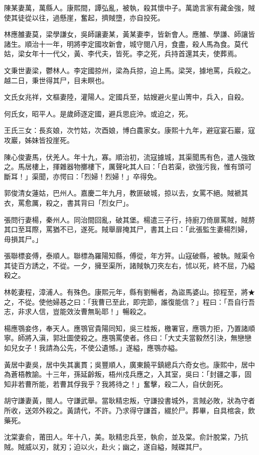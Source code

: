 \begin{pinyinscope}
陳某妻萬，萬縣人。康熙間，譚弘亂，被執，殺其懷中子。萬詭言家有藏金強，賊使其徒從以往，過懸崖，奮起，擠賊墮，亦自投死。

林應雒妻莫，梁學謙女，吳師讓妻某，黃某妻李，皆新會人。應雒、學謙、師讓皆諸生。順治十一年，明將李定國攻新會，城守閱八月，食盡，殺人馬為食。莫代姑，梁女年十一代父，黃、李代夫，皆死。李之死，兵持首還其夫，使葬焉。

文秉世妻梁，鬱林人。李定國掠州，梁為兵掠，迫上馬。梁哭，據地罵，兵殺之。越二日，秉世得其尸，目未瞑也。

文氏女兆祥，文樞妻陸，灌陽人。定國兵至，姑嫂避火星山箐中，兵入，自殺。

何氏女，昭平人。是歲師逐定國，避兵思庇沖。或迫之，死。

王氏三女：長亥娘，次竹姑，次酉娘，博白農家女。康熙十九年，避寇宴石巖，寇攻巖，姊妹皆投崖死。

陳心俊妻馬，伏羌人。年十九，寡。順治初，流寇據城，其渠聞馬有色，遣人強致之。馬居樓上，揮雜器物擲樓下，厲聲叱其人曰：「白若渠，欲強污我，惟有頭可斷耳！」渠聞，亦愕曰：「烈婦！烈婦！」卒得免。

郭俊清女蓮姑，巴州人。嘉慶二年九月，教匪破城，掠以去，女罵不絕。賊褫其衣，罵愈厲，殺之，書其背曰「烈女尸」。

張問行妻楊，秦州人。同治間回亂，破其堡。楊遣三子行，持廚刀倚扉罵賊，賊剺其口至耳際，罵猶不已，遂死。賊舉扉掩其尸，書其上曰：「此張監生妻楊烈婦，毋損其尸。」

張聯標妾傅，泰順人。聯標為羅陽知縣，傅從，年方笄。山寇破縣，被執。賊渠令其徒百方誘之，不從。一夕，擁至渠所，諸賊執刀夾左右，怵以死，終不屈，乃縊殺之。

林乾妻程，漳浦人。有殊色。康熙元年，縣有劉暢者，為盜馬婆山。掠程至，將★之，不從。使他婦惎之曰：「我曹已至此，即完節，誰復能信？」程曰：「吾自行吾志，非求人信，豈能效汝曹無恥耶！」暢殺之。

楊應鶚妾佟，奉天人。應鶚官貴陽同知，吳三桂叛，檄署官，應鶚力拒，乃置諸順寧。師將入滇，郭壯圖使殺之。應鶚罵使者。佟曰：「大丈夫當毅然引決，無戀戀如兒女子！我請為公先，不使公遺憾。」遂縊，應鶚亦縊。

黃居中妻吳，居中失其裏貫；吳豐順人，廣東饒平鎮總兵六奇女也。康熙中，居中為蒼梧教諭。十三年，孫延齡叛，梧州戍兵應之，入其室，吳曰：「封疆之事，固知非若曹所能，若曹其俘我乎？我將待之！」奮擊，殺二人，自伏劍死。

胡守謙妻黃，閩人。守謙武舉。當耿精忠叛，守謙投書城外，言賊必敗，狀為守者所收，送郊外殺之。黃請代，不許。乃求得守謙首，綴於尸。葬畢，自具棺衾，飲藥死。

沈棠妻俞，莆田人。年十八，美。耿精忠兵至，執俞，並及棠。俞計脫棠，乃抗賊。賊威以刃，就刃；迫以火，赴火；幽之，遂自縊，賊磔其尸。


\end{pinyinscope}
